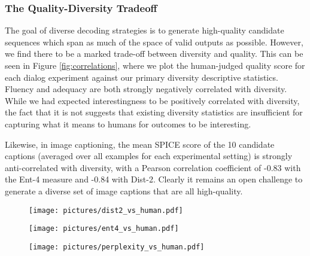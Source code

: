 \documentclass[thesis.tex]{subfiles}
\begin{document}
\subsubsection{The Quality-Diversity Tradeoff}
The goal of diverse decoding strategies is to generate high-quality candidate sequences which span as much of the space of valid outputs as possible. However, we find there to be a marked trade-off between diversity and quality. This can be seen in Figure \ref{fig:correlations}, where we plot the human-judged quality score for each dialog experiment against our primary diversity descriptive statistics. Fluency and adequacy are both strongly negatively correlated with diversity. While we had expected interestingness to be positively correlated with diversity, the fact that it is not suggests that existing diversity statistics are insufficient for capturing what it means to humans for outcomes to be interesting.

Likewise, in image captioning, the mean SPICE score of the 10 candidate captions (averaged over all examples for each experimental setting) is strongly anti-correlated with diversity, with a Pearson correlation coefficient of -0.83 with the Ent-4 measure and -0.84 with Dist-2. Clearly it remains an open challenge to generate a diverse set of image captions that are all high-quality.

\begin{figure*}[ht]
    \centering
    \begin{subfigure}[l]{5cm}
        \texttt{[image: pictures/dist2\_vs\_human.pdf]}
    \end{subfigure}
    \begin{subfigure}[l]{5cm}
        \texttt{[image: pictures/ent4\_vs\_human.pdf]}
    \end{subfigure}
    \begin{subfigure}[l]{5cm}
        \texttt{[image: pictures/perplexity\_vs\_human.pdf]}
    \end{subfigure}
    \caption{Each decoding strategy is plotted, showing that human-perceived quality is negatively correlated with diversity. The Pearson Correlation coefficients between each statistic and the average of fluency, coherence, and interestingness are shown in parentheses.}
    \label{fig:correlations}
\end{figure*}
\end{document}
